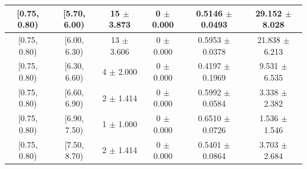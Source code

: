 \begin{longtable}{|c|c|c|c|c|c|}
\hline
[0.75, 0.80) & [5.70, 6.00) & 15 $\pm$ 3.873 & 0 $\pm$ 0.000 & 0.5146 $\pm$ 0.0493 & 29.152 $\pm$ 8.028 \\ 
\hline
[0.75, 0.80) & [6.00, 6.30) & 13 $\pm$ 3.606 & 0 $\pm$ 0.000 & 0.5953 $\pm$ 0.0378 & 21.838 $\pm$ 6.213 \\ 
\hline
[0.75, 0.80) & [6.30, 6.60) & 4 $\pm$ 2.000 & 0 $\pm$ 0.000 & 0.4197 $\pm$ 0.1969 & 9.531 $\pm$ 6.535 \\ 
\hline
[0.75, 0.80) & [6.60, 6.90) & 2 $\pm$ 1.414 & 0 $\pm$ 0.000 & 0.5992 $\pm$ 0.0584 & 3.338 $\pm$ 2.382 \\ 
\hline
[0.75, 0.80) & [6.90, 7.50) & 1 $\pm$ 1.000 & 0 $\pm$ 0.000 & 0.6510 $\pm$ 0.0726 & 1.536 $\pm$ 1.546 \\ 
\hline
[0.75, 0.80) & [7.50, 8.70) & 2 $\pm$ 1.414 & 0 $\pm$ 0.000 & 0.5401 $\pm$ 0.0864 & 3.703 $\pm$ 2.684 \\ 
\hline
\end{longtable}

